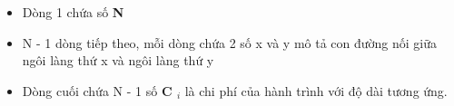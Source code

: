 \begin{itemize}
	\item Dòng 1 chứa số \textbf{ N }
	\item N - 1 dòng tiếp theo, mỗi dòng chứa 2 số x và y mô tả con đường nối giữa ngôi làng thứ x và ngôi làng thứ y
	\item Dòng cuối chứa N - 1 số \textbf{ C $_ i $} là chi phí của hành trình với độ dài tương ứng.
\end{itemize}